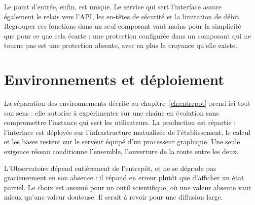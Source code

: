 Le point d'entrée, enfin, est unique. Le service qui sert l'interface assure également le relais
vers l'API, les en-têtes de sécurité et la limitation de débit. Regrouper ces fonctions dans un
seul composant vaut moins pour la simplicité que pour ce que cela écarte : une protection
configurée dans un composant qui ne tourne pas est une protection absente, avec en plus la
croyance qu'elle existe.

\section{Environnements et déploiement}

La séparation des environnements décrite au chapitre~\ref{ch:entrepot} prend ici tout son sens :
elle autorise à expérimenter sur une chaîne en évolution sans compromettre l'instance qui sert
les utilisateurs. La production est répartie : l'interface est déployée sur l'infrastructure
mutualisée de l'établissement, le calcul et les bases restent sur le serveur équipé d'un
processeur graphique. Une seule exigence réseau conditionne l'ensemble, l'ouverture de la route
entre les deux.

L'Observatoire dépend entièrement de l'entrepôt, et ne se dégrade pas gracieusement en son
absence : il répond en erreur plutôt que d'afficher un état partiel. Le choix est assumé pour un
outil scientifique, où une valeur absente vaut mieux qu'une valeur douteuse. Il serait à revoir
pour une diffusion large.
